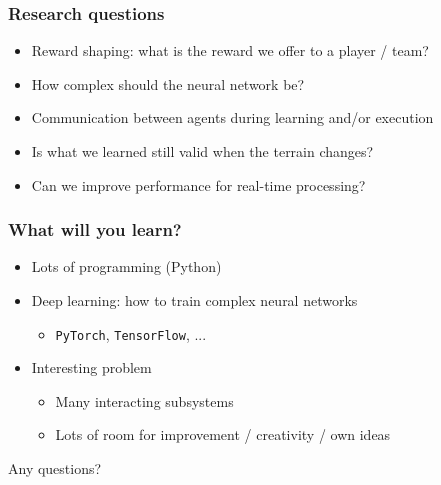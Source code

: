 \documentclass{beamer}
\begin{document}
\begin{frame}
\frametitle{Research questions}
\begin{itemize}
   \item Reward shaping: what is the reward we offer to a player / team?
    \item How complex should the neural network be?
    \item Communication between agents during learning and/or execution
    \item Is what we learned still valid when the terrain changes?
    \item Can we improve performance for real-time processing?
\end{itemize}
\end{frame}

\begin{frame}
\frametitle{What will you learn?}
\begin{itemize}
    \item Lots of programming (Python)
    \item Deep learning: how to train complex neural networks
    \begin{itemize}
        \item {\tt PyTorch}, {\tt TensorFlow}, ...
    \end{itemize}
    \item Interesting problem
        \begin{itemize}
            \item Many interacting subsystems
            \item Lots of room for improvement / creativity / own ideas
        \end{itemize} 
\end{itemize}
\end{frame}

\begin{frame}%

\begin{center}
\Huge Any questions?
\end{center}

\end{frame}
\end{document}
